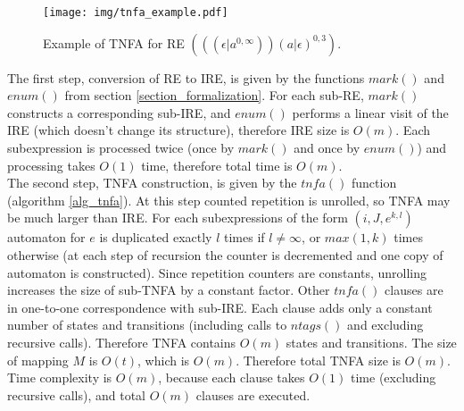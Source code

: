 \documentclass[AMA,STIX1COL]{WileyNJD-v2}
\begin{document}

\begin{figure}
\texttt{[image: img/tnfa\_example.pdf]}
\vspace{-2em}
\caption{Example of TNFA for RE
$(((\epsilon|a^{0,\infty}))(a|\epsilon)^{0,3})$.}\label{fig:tnfa_example}
\end{figure}

The first step, conversion of RE to IRE, is given by the functions $mark()$ and $enum()$ from section \ref{section_formalization}.
%
For each sub-RE, $mark()$ constructs a corresponding sub-IRE,
and $enum()$ performs a linear visit of the IRE (which doesn't change its structure),
therefore IRE size is $O(m)$.
%
Each subexpression is processed twice (once by $mark()$ and once by $enum()$)
and processing takes $O(1)$ time, therefore total time is $O(m)$.
\\

The second step, TNFA construction, is given by the $tn\!f\!a()$ function (algorithm \ref{alg_tnfa}).
At this step counted repetition is unrolled, so TNFA may be much larger than IRE.
For each subexpressions of the form $(i, J, e^{k,l})$ automaton for $e$ is duplicated exactly $l$ times if $l \neq \infty$, or $max(1, k)$ times otherwise
(at each step of recursion the counter is decremented and one copy of automaton is constructed).
Since repetition counters are constants, unrolling increases the size of sub-TNFA by a constant factor.
Other $tn\!f\!a()$ clauses are in one-to-one correspondence with sub-IRE.
Each clause adds only a constant number of states and transitions (including calls to $ntags()$ and excluding recursive calls).
Therefore TNFA contains $O(m)$ states and transitions.
The size of mapping $M$ is $O(t)$, which is $O(m)$.
Therefore total TNFA size is $O(m)$.
Time complexity is $O(m)$, because each clause takes $O(1)$ time (excluding recursive calls), and total $O(m)$ clauses are executed.
\\
\end{document}
